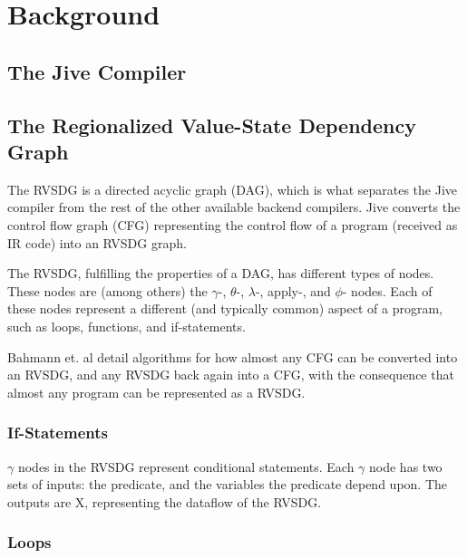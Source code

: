 
\section{Background}

\subsection{The Jive Compiler}
\label{background:jive}


\subsection{The Regionalized Value-State Dependency Graph}
\label{background:RVSDG}

The RVSDG is a directed acyclic graph (DAG), which is what separates the Jive
compiler from the rest of the other available backend compilers. Jive converts
the control flow graph (CFG) representing the control flow of a program
(received as IR code) into an RVSDG graph.

The RVSDG, fulfilling the properties of a DAG, has different types of nodes.
These nodes are (among others) the $\gamma$-, $\theta$-, $\lambda$-, apply-, and
$\phi$- nodes. Each of these nodes represent a different (and typically common)
aspect of a program, such as loops, functions, and if-statements.

Bahmann et. al detail algorithms for how almost any CFG
can be converted into an RVSDG, and any RVSDG back again into a CFG, with the
consequence that almost any program can
be represented as a RVSDG.

\subsubsection{If-Statements}

\textit{$\gamma$} nodes in the RVSDG represent conditional statements.
Each $\gamma$ node has two sets of inputs: the predicate, and the
variables the predicate depend upon.
The outputs are X, representing the dataflow of the
RVSDG.

\subsubsection{Loops}

